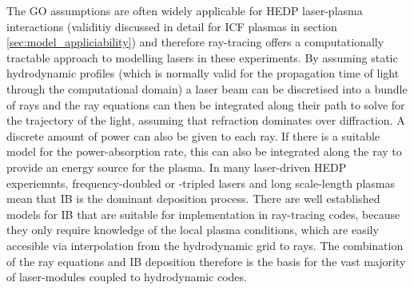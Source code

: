 The \ac{GO} assumptions are often widely applicable for \ac{HEDP} laser-plasma interactions (validitiy discussed in detail for \ac{ICF} plasmas in section \ref{sec:model_appliciability}) and therefore ray-tracing offers a computationally tractable approach to modelling lasers in these experiments.
By assuming static hydrodynamic profiles (which is normally valid for the propagation time of light through the computational domain) a laser beam can be discretised into a bundle of rays and the ray equations can then be integrated along their path to solve for the trajectory of the light, assuming that refraction dominates over diffraction.
A discrete amount of power can also be given to each ray.
If there is a suitable model for the power-absorption rate, this can also be integrated along the ray to provide an energy source for the plasma.
In many laser-driven \ac{HEDP} experiemnts, frequency-doubled or -tripled lasers and long scale-length plasmas mean that \ac{IB} is the dominant deposition process.
There are well established models for \ac{IB} that are suitable for implementation in ray-tracing codes, because they only require knowledge of the local plasma conditions, which are easily accesible via interpolation from the hydrodynamic grid to rays.
The combination of the ray equations and \ac{IB} deposition therefore is the basis for the vast majority of laser-modules coupled to hydrodynamic codes.

